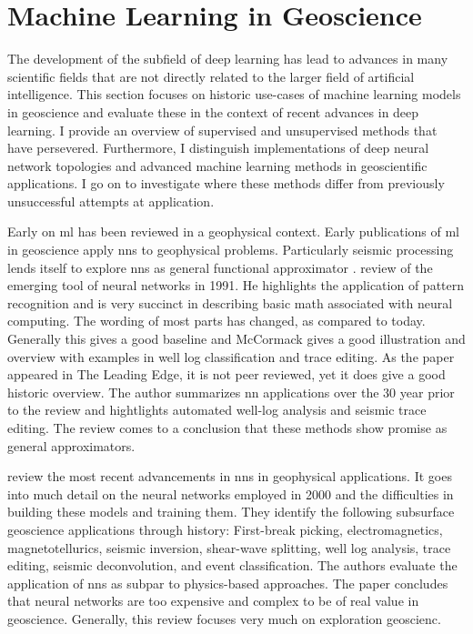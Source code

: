 \section{Machine Learning in Geoscience}
The development of the subfield of deep learning has lead to advances in many scientific fields that are not directly related to the larger field of artificial intelligence. This section focuses on historic use-cases of machine learning models in geoscience and evaluate these in the context of recent advances in deep learning. I provide an overview of supervised and unsupervised methods that have persevered. Furthermore, I distinguish implementations of deep neural network topologies and advanced machine learning methods in geoscientific applications. I go on to investigate where these methods differ from previously unsuccessful attempts at application.

Early on \acf{ml} has been reviewed in a geophysical context. Early publications of \ac{ml} in geoscience apply \acp{nn} to geophysical problems. Particularly seismic processing lends itself to explore \acp{nn} as general functional approximator \citep{Hornik1989-bl}. \citet{McCormack1991-pm} review of the emerging tool of neural networks in 1991. He highlights the application of pattern recognition and is very succinct in describing basic math associated with neural computing. The wording of most parts has changed, as compared to today. Generally this gives a good baseline and McCormack gives a good illustration and overview with examples in well log classification and trace editing. As the paper appeared in The Leading Edge, it is not peer reviewed, yet it does give a good historic overview. The author summarizes \ac{nn} applications over the 30 year prior to the review and hightlights automated well-log analysis and seismic trace editing. The review comes to a conclusion that these methods show promise as general approximators. 

\citet{Van_der_Baan2000-jz} review the most recent advancements in \acfp{nn} in geophysical applications. It goes into much detail on the neural networks employed in 2000 and the difficulties in building these models and training them. They identify the following subsurface geoscience applications through history: First-break picking, electromagnetics, magnetotellurics, seismic inversion, shear-wave splitting, well log analysis, trace editing, seismic deconvolution, and event classification. The authors evaluate the application of \acp{nn} as subpar to physics-based approaches. The paper concludes that neural networks are too expensive and complex to be of real value in geoscience. Generally, this review focuses very much on exploration geoscienc. 

